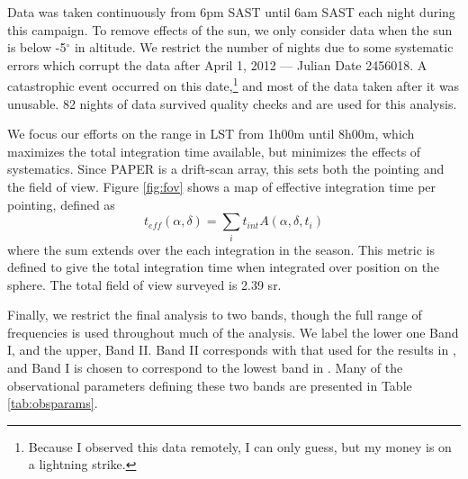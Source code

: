 Data was taken continuously from 6pm SAST until 6am SAST each night during this campaign. To remove
effects of the sun, we only consider data when the sun is below -5$^\circ$ in altitude. We restrict
the number of nights due to some systematic errors which corrupt the data after April 1, 2012
--- Julian Date 2456018. A catastrophic event occurred on this date,\footnote{Because I observed
this data remotely, I can only guess, but my money is on a lightning strike.} and most of the data
taken after it was unusable. 82 nights of data survived quality checks and are used for this
analysis. 

We focus our efforts on the range in LST from 1h00m until 8h00m, which maximizes the total
integration time available, but minimizes the effects of systematics. Since PAPER is a drift-scan
array, this sets both the pointing and the field of view. Figure \ref{fig:fov} shows a map of effective 
integration time per pointing, defined as 
\begin{equation}
  t_{eff}(\alpha,\delta) = \sum_{i} t_{int} A(\alpha,\delta,t_i)
  \label{eq:teff}
\end{equation}
where the sum extends over the each integration in the season. This metric is defined to give the total 
integration time when integrated over position on the sphere. The total field of view surveyed is 2.39 sr. 

Finally, we restrict the final analysis to two bands, though the full range of frequencies is used 
throughout much of the analysis. We label the lower one Band I, and the upper, Band II. Band II 
corresponds with that used for the results in \citet{Parsons2014}, and Band I is chosen to correspond 
to the lowest band in \citet{Jacobs2014}. Many of the observational parameters defining these two bands 
are presented in Table \ref{tab:obsparams}.

